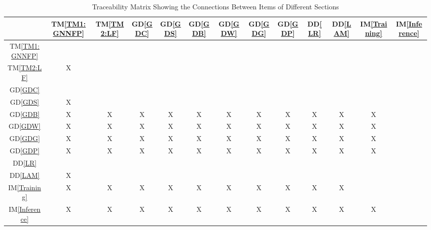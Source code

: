 \documentclass[12pt]{article}
\newcommand{\dref}[1]{GD\ref{#1}}
\newcommand{\ddref}[1]{DD\ref{#1}}
\newcommand{\tref}[1]{TM\ref{#1}}
\newcommand{\iref}[1]{IM\ref{#1}}
\begin{document}
\begin{table}[h!]
\centering
\begin{tabular}{|c|c|c|c|c|c|c|c|c|c|c|c|c|}
\hline
	                   & \tref{TM1:GNNFP} & \tref{TM2:LF} & \dref{GDC} & \dref{GDS} & \dref{GDB} & \dref{GDW} & \dref{GDG} & \dref{GDP} & \ddref{LR} & \ddref{LAM} & \iref{Training} & \iref{Inference} \\
\hline
\tref{TM1:GNNFP}      &   &   &   &   &   &   &   &   &   &   &   &   \\ \hline
\tref{TM2:LF}         & X &   &   &   &   &   &   &   &   &   &   &   \\ \hline
\dref{GDC}            &   &   &   &   &   &   &   &   &   &   &   &   \\ \hline
\dref{GDS}            & X &   &   &   &   &   &   &   &   &   &   &   \\ \hline
\dref{GDB}            & X & X & X & X  & X  & X  & X  & X  & X  & X  & X  &   \\ \hline
\dref{GDW}            & X & X & X & X  & X  & X  & X  & X  & X  & X  & X  &   \\ \hline
\dref{GDG}            & X & X & X & X  & X  & X  & X  & X  & X  & X  & X  &   \\ \hline
\dref{GDP}            & X & X & X & X  & X  & X  & X  & X  & X  & X  & X  &   \\ \hline
\ddref{LR}            &   &   &   &   &   &   &   &   &   &   &   &   \\ \hline
\ddref{LAM}           & X &   &   &   &   &   &   &   &   &   &   &   \\ \hline
\iref{Training}       & X & X & X & X  & X  & X  & X  & X  & X  & X &   &   \\ \hline
\iref{Inference}      & X  & X  & X  & X  & X  & X  & X  & X  & X  & X  & X  &   \\ \hline
\end{tabular}
\caption{Traceability Matrix Showing the Connections Between Items of Different Sections}
\label{Table:trace}
\end{table}
\end{document}
